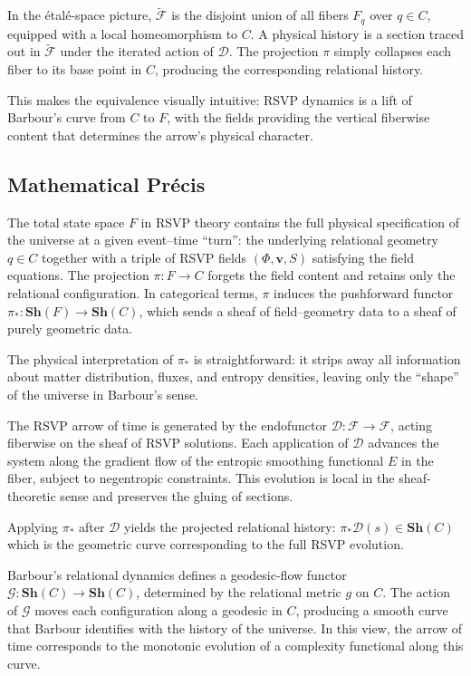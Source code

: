 \documentclass[11pt]{article}
\theoremstyle{plain}
\theoremstyle{definition}
\begin{document}
In the étalé-space picture, $\widetilde{\mathscr{F}}$ is the disjoint union of all fibers $F_q$ over $q \in C$, equipped with a local homeomorphism to $C$. A physical history is a section traced out in $\widetilde{\mathscr{F}}$ under the iterated action of $\mathcal{D}$. The projection $\pi$ simply collapses each fiber to its base point in $C$, producing the corresponding relational history.

This makes the equivalence visually intuitive: RSVP dynamics is a lift of Barbour’s curve from $C$ to $F$, with the fields providing the vertical fiberwise content that determines the arrow’s physical character.

\subsection{Mathematical Précis}
The total state space $F$ in RSVP theory contains the full physical specification of the universe at a given event–time “turn”: the underlying relational geometry $q \in C$ together with a triple of RSVP fields $(\Phi, \mathbf{v}, S)$ satisfying the field equations. The projection
$\pi: F \to C$
forgets the field content and retains only the relational configuration. In categorical terms, $\pi$ induces the pushforward functor
$\pi_* : \mathbf{Sh}(F) \to \mathbf{Sh}(C)$,
which sends a sheaf of field–geometry data to a sheaf of purely geometric data.

The physical interpretation of $\pi_*$ is straightforward: it strips away all information about matter distribution, fluxes, and entropy densities, leaving only the “shape” of the universe in Barbour’s sense.

The RSVP arrow of time is generated by the endofunctor
$\mathcal{D}: \mathscr{F} \to \mathscr{F}$,
acting fiberwise on the sheaf of RSVP solutions. Each application of $\mathcal{D}$ advances the system along the gradient flow of the entropic smoothing functional $E$ in the fiber, subject to negentropic constraints. This evolution is local in the sheaf-theoretic sense and preserves the gluing of sections.

Applying $\pi_*$ after $\mathcal{D}$ yields the projected relational history:
$\pi_* \mathcal{D} (s) \in \mathbf{Sh}(C)$
which is the geometric curve corresponding to the full RSVP evolution.

Barbour’s relational dynamics defines a geodesic-flow functor
$\mathcal{G} : \mathbf{Sh}(C) \to \mathbf{Sh}(C)$,
determined by the relational metric $g$ on $C$. The action of $\mathcal{G}$ moves each configuration along a geodesic in $C$, producing a smooth curve that Barbour identifies with the history of the universe. In this view, the arrow of time corresponds to the monotonic evolution of a complexity functional along this curve.
\end{document}
